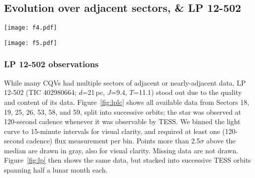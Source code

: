 \documentclass[11pt,twocolumn,tighten]{aastex63}
\begin{document}
\subsection{Evolution over adjacent sectors, \& LP 12-502}

\begin{figure*}[!tp]
	\begin{center}
		\centering
		\texttt{[image: f4.pdf]}
		\vspace{-0.4cm}
		\caption{
      {\bf LP 12-502 (TIC~402980664) light curve}, where each time
      chunk represents one TESS orbit.  Data were acquired in Sectors
      18-19, 25-26, 53, and 57-58.  Flares are drawn in gray.  The red
      vertical lines highlight apparently instantaneous state changes
      in the shape of the dip pattern.  The light curve is binned to
      15-minute intervals so that there are 96 points per day.  Data
      gaps with more than one missing 15-minute cadence appear in
      white.
		}
		\label{fig:lplc}
	\end{center}
\end{figure*}


\begin{figure*}[!t]
	\begin{center}
		\centering
		\texttt{[image: f5.pdf]}
		\vspace{-0.45cm}
		\caption{
      {\bf Evolution of LP 12-502} ($P$=18.6\,h) at fixed period and
      epoch over three years.  Each panel shows one (stacked) TESS
      orbit; small text denotes relative cycle number.  There are 200
      binned black points per cycle.  The TESS pointing law dictates
      time gaps; larger gaps tend to yield larger shape changes.  The
      dips usually evolve over tens to hundreds of cycles.  However
      cycles 1233-1264 show a dip that ``switched'' from a depth and
      duration of 3\% and 3\,hr to 0.3\% and 1\,hr over less than one
      cycle (cf.~Figure~\ref{fig:lplc}).
		}
		\label{fig:lp}
	\end{center}
\end{figure*}

\subsubsection{LP 12-502 observations}
While many CQVs had multiple sectors of adjacent or nearly-adjacent
data, LP 12-502 (TIC 402980664; $d$=21\,pc, $J$=9.4, $T$=11.1) stood
out due to the quality and content of its data.  Figure~\ref{fig:lplc}
shows all available data from Sectors 18, 19, 25, 26, 53, 58, and 59,
split into successive orbits; the star was observed at 120-second
cadence whenever it was observable by TESS.  We binned the light curve
to 15-minute intervals for visual clarity, and required at least one
(120-second cadence) flux measurement per bin.  Points more than
2.5$\sigma$ above the median are drawn in gray, also for visual
clarity.  Missing data are not drawn.  Figure~\ref{fig:lp} then shows
the same data, but stacked into successive TESS orbits spanning half a
lunar month each.
\end{document}
